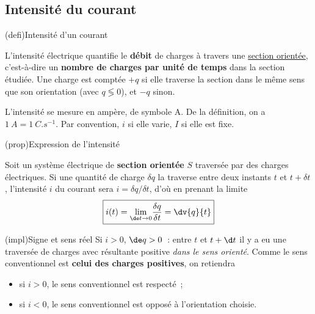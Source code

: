 \documentclass[../../main/main.tex]{subfiles}
\begin{document}
\subsection{Intensité du courant}

\begin{tcb}[label=def:intensité, sidebyside](defi){Intensité
			d'un courant}

	L'intensité électrique quantifie le \textbf{débit} de charges à travers une
	\underline{section orientée}, c'est-à-dire un \textbf{nombre de charges par
		unité de temps} dans la section étudiée. Une charge est comptée $+q$
	si elle traverse la section dans le même sens que son orientation (avec $q
		\lessgtr 0$), et $-q$ sinon.

	\tcblower
	L'intensité se mesure en ampère, de symbole A. De la définition, on a
	$\SI{1}{A} = \SI{1}{C.s^{-1}}$.
	Par convention, $i$ si elle varie, $I$ si elle est fixe.
\end{tcb}
\begin{tcb}[label=prop:intensité](prop){Expression de l'intensité}

	Soit un système électrique de \textbf{section orientée} $S$ traversée par
	des charges électriques. Si une quantité de charge $\delta q$ la traverse
	entre deux instants $t$ et $t + \delta t$, l'intensité $i$ du courant sera
	$i = \delta q/\delta t$, d'où en prenant la limite
	\[ \boxed{i(t) = \underset{\de t\rightarrow0}{\lim} \frac{\delta q}{\delta t} =
			\dv{q}{t}}\]
\end{tcb}
\begin{tcb}[label=impl:intensconv](impl){Signe et sens réel}
	Si $i > 0$, $\de q > 0$~: entre $t$ et $t+\d t$ il y a eu une traversée de
	charges avec résultante positive \textit{dans le sens orienté}. Comme le
	sens conventionnel est \textbf{celui des charges positives}, on retiendra
	\begin{itemize}
		\item si $i > 0$, le sens conventionnel est respecté~;
		\item si $i < 0$, le sens conventionnel est opposé à l'orientation
		      choisie.
	\end{itemize}
\end{tcb}
\end{document}
